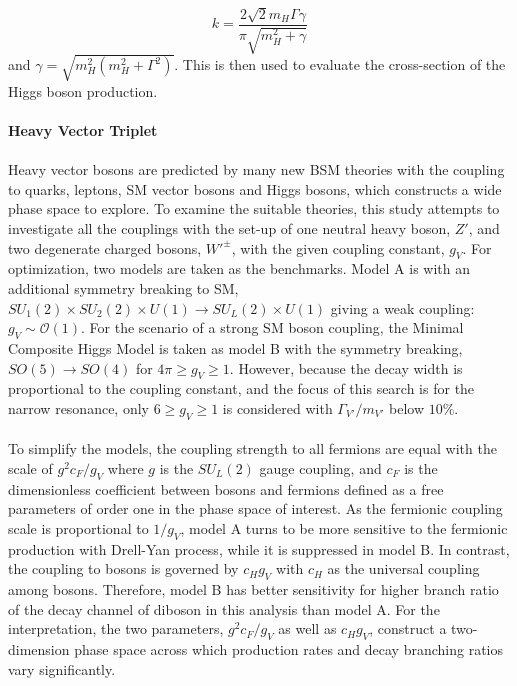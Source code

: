 \begin{equation}
k=\frac{2\sqrt{2}m_{H}\Gamma\gamma}{\pi\sqrt{m_{H}^2+\gamma}}
\end{equation}
and $\gamma=\sqrt{m_{H}^2(m_{H}^2+\Gamma^2)}$. This is then used to evaluate the cross-section of the Higgs boson production.
\\
\\{\bf Heavy Vector Triplet}
\\
\\Heavy vector bosons are predicted by many new BSM theories with the coupling to quarks, leptons, SM vector bosons and Higgs bosons, which constructs a wide phase space to explore. To examine the suitable theories, this study attempts to investigate all the couplings with the set-up of one neutral heavy boson, $Z'$, and two degenerate charged bosons, $W'^{\pm}$, with the given coupling constant, $g_{V}$. For optimization,  two models are taken as the benchmarks\cite{Pappadopulo:2014qza,deBlas:2012qp}. Model A is with an additional symmetry breaking to SM, $SU_{1}(2)\times SU_{2}(2) \times U(1) \rightarrow SU_{L}(2) \times U(1)$ giving a weak coupling: $g_{V} \sim \mathcal{O}(1)$. For the scenario of a strong SM boson coupling, the Minimal Composite Higgs Model is taken as model B with the symmetry breaking, $SO(5) \rightarrow SO(4)$ for $4\pi \geq g_{V} \geq 1$. However, because the decay width is proportional to the coupling constant, and the focus of this search is for the narrow resonance, only $6 \geq g_{V} \geq 1$ is considered with $\Gamma_{V'}/m_{V'}$ below $10\%$.
\\
\\To simplify the models, the coupling strength to all fermions are equal with the scale of $g^2c_{F}/g_{V}$ where $g$ is the $SU_{L}(2)$ gauge coupling, and $c_{F}$ is the dimensionless coefficient between bosons and fermions defined as a free parameters of order one in the phase space of interest. As the fermionic coupling scale is proportional to $1/g_{V}$, model A turns to be more sensitive to the fermionic production with Drell-Yan process, while it is suppressed in model B. In contrast, the coupling to bosons is governed by $c_{H}g_{V}$ with $c_{H}$ as the universal coupling among bosons. Therefore, model B has better sensitivity for higher branch ratio of the decay channel of diboson in this analysis than model A. For the interpretation, the two parameters, $g^2c_{F}/g_{V}$ as well as $c_{H}g_{V}$, construct a two-dimension phase space across which production rates and decay branching ratios vary significantly. 
